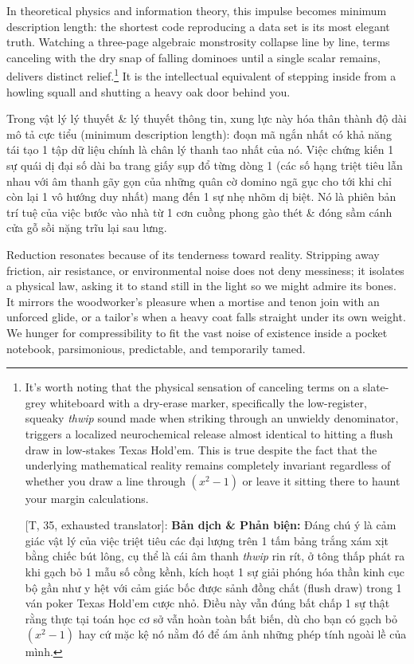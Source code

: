 \documentclass[11pt]{article}
\begin{document}
In theoretical physics and information theory, this impulse becomes minimum description length: the shortest code reproducing a data set is its most elegant truth. Watching a three-page algebraic monstrosity collapse line by line, terms canceling with the dry snap of falling dominoes until a single scalar remains, delivers distinct relief.\footnote{It's worth noting that the physical sensation of canceling terms on a slate-grey whiteboard with a dry-erase marker, specifically the low-register, squeaky \textit{thwip} sound made when striking through an unwieldy denominator, triggers a localized neurochemical release almost identical to hitting a flush draw in low-stakes Texas Hold'em. This is true despite the fact that the underlying mathematical reality remains completely invariant regardless of whether you draw a line through $(x^2 - 1)$ or leave it sitting there to haunt your margin calculations.
	
	\textsf{[T, 35, exhausted translator]:} \textbf{Bản dịch \& Phản biện:} Đáng chú ý là cảm giác vật lý của việc triệt tiêu các đại lượng trên 1 tấm bảng trắng xám xịt bằng chiếc bút lông, cụ thể là cái âm thanh \textit{thwip} rin rít, ở tông thấp phát ra khi gạch bỏ 1 mẫu số cồng kềnh, kích hoạt 1 sự giải phóng hóa thần kinh cục bộ gần như y hệt với cảm giác bốc được sảnh đồng chất (flush draw) trong 1 ván poker Texas Hold'em cược nhỏ. Điều này vẫn đúng bất chấp 1 sự thật rằng thực tại toán học cơ sở vẫn hoàn toàn bất biến, dù cho bạn có gạch bỏ $(x^2 - 1)$ hay cứ mặc kệ nó nằm đó để ám ảnh những phép tính ngoài lề của mình.} It is the intellectual equivalent of stepping inside from a howling squall and shutting a heavy oak door behind you.

Trong vật lý lý thuyết \& lý thuyết thông tin, xung lực này hóa thân thành độ dài mô tả cực tiểu (minimum description length): đoạn mã ngắn nhất có khả năng tái tạo 1 tập dữ liệu chính là chân lý thanh tao nhất của nó. Việc chứng kiến 1 sự quái dị đại số dài ba trang giấy sụp đổ từng dòng 1 (các số hạng triệt tiêu lẫn nhau với âm thanh gãy gọn của những quân cờ domino ngã gục cho tới khi chỉ còn lại 1 vô hướng duy nhất) mang đến 1 sự nhẹ nhõm dị biệt. Nó là phiên bản trí tuệ của việc bước vào nhà từ 1 cơn cuồng phong gào thét \& đóng sầm cánh cửa gỗ sồi nặng trĩu lại sau lưng.

Reduction resonates because of its tenderness toward reality. Stripping away friction, air resistance, or environmental noise does not deny messiness; it isolates a physical law, asking it to stand still in the light so we might admire its bones. It mirrors the woodworker's pleasure when a mortise and tenon join with an unforced glide, or a tailor's when a heavy coat falls straight under its own weight. We hunger for compressibility to fit the vast noise of existence inside a pocket notebook, parsimonious, predictable, and temporarily tamed.
\end{document}
